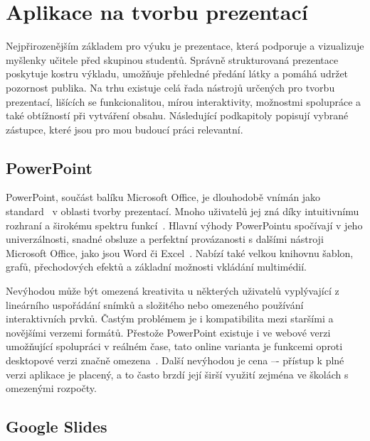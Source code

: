 

\section{Aplikace na tvorbu prezentací}

Nejpřirozenějším základem pro výuku je prezentace, která podporuje a vizualizuje myšlenky učitele před skupinou studentů.
Správně strukturovaná prezentace poskytuje kostru výkladu, umožňuje přehledné předání látky a pomáhá udržet pozornost publika.
Na trhu existuje celá řada nástrojů určených pro tvorbu prezentací, lišících se funkcionalitou, mírou interaktivity, možnostmi spolupráce a také obtížností při vytváření obsahu.
Následující podkapitoly popisují vybrané zástupce, které jsou pro mou budoucí práci relevantní.

\subsection{PowerPoint}

PowerPoint, součást balíku Microsoft Office, je dlouhodobě vnímán jako standard~\cite{pp_usage} v oblasti tvorby prezentací.
Mnoho uživatelů jej zná díky intuitivnímu rozhraní a širokému spektru funkcí~\cite{pp_usage}.
Hlavní výhody PowerPointu spočívají v jeho univerzálnosti, snadné obsluze a perfektní provázanosti s dalšími nástroji Microsoft Office, jako jsou Word či Excel~\cite{pp_excel, pp_word}.
Nabízí také velkou knihovnu šablon, grafů, přechodových efektů a základní možnosti vkládání multimédií.

Nevýhodou může být omezená kreativita u některých uživatelů vyplývající z lineárního uspořádání snímků a složitého nebo omezeného používání interaktivních prvků. 
Častým problémem je i kompatibilita mezi staršími a novějšími verzemi formátů.
Přestože PowerPoint existuje i ve webové verzi umožňující spolupráci v reálném čase, tato online varianta je funkcemi oproti desktopové verzi značně omezena~\cite{pp_platforms}.
Další nevýhodou je cena –- přístup k plné verzi aplikace je placený, a to často brzdí její širší využití zejména ve školách s omezenými rozpočty.

\subsection{Google Slides}\label{text:google_slides}

